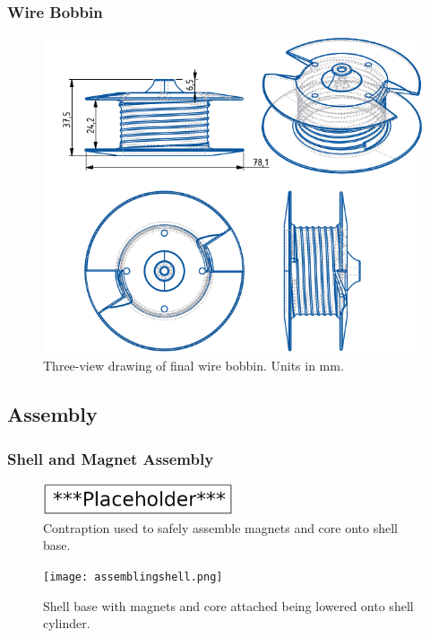 \documentclass[a4paper,12pt]{article}
\begin{document}
\subsubsection{Wire Bobbin}

\begin{figure}[h!] 
	\centering
	\includegraphics[scale=0.5]{bobbin.png}
	\caption{Three-view drawing of final wire bobbin. Units in mm.}
	\label{fg:bobbin}
\end{figure}

\subsection{Assembly}

\subsubsection{Shell and Magnet Assembly}
\begin{figure}[h!] 
	\centering
	\includegraphics[width=0.5\textwidth]{placeholder.png}
	\caption{Contraption used to safely assemble magnets and core onto shell base.}
	\label{fg:assemblingmagnet}
\end{figure}

\begin{figure}[h!]
	\centering
	\texttt{[image: assemblingshell.png]}
	\caption{Shell base with magnets and core attached being lowered onto shell cylinder.}
	\label{fg:assemblingshell}
\end{figure}
\end{document}
